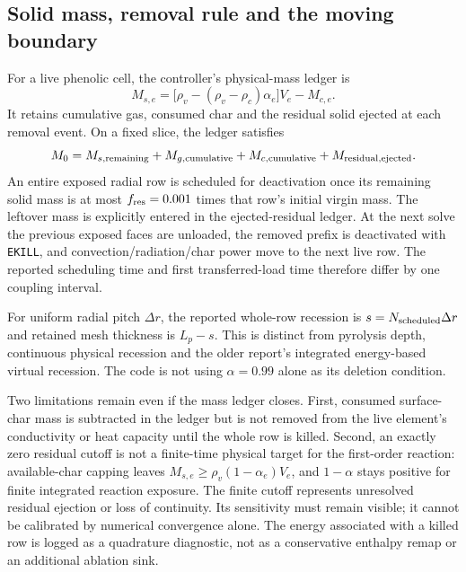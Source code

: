 \documentclass[oneside,openany]{amsdtx}
\begin{document}
\subsection{Solid mass, removal rule and the moving boundary}
For a live phenolic cell, the controller's physical-mass ledger is
\begin{equation}
 M_{s,e}=\bigl[\rho_v-(\rho_v-\rho_c)\alpha_e\bigr]V_e-M_{c,e}.
\end{equation}
It retains cumulative gas, consumed char and the residual solid ejected at each removal event. On a fixed slice, the ledger satisfies
\begin{equation}
 M_0=M_{s,\rm remaining}+M_{g,\rm cumulative}+M_{c,\rm cumulative}+M_{\rm residual,ejected}.
\end{equation}
An entire exposed radial row is scheduled for deactivation once its remaining solid mass is at most $f_{\rm res}=0.001$ times that row's initial virgin mass. The leftover mass is explicitly entered in the ejected-residual ledger. At the next solve the previous exposed faces are unloaded, the removed prefix is deactivated with \texttt{EKILL}, and convection/radiation/char power move to the next live row. The reported scheduling time and first transferred-load time therefore differ by one coupling interval.

For uniform radial pitch $\Delta r$, the reported whole-row recession is $s=N_{\rm scheduled}\Delta r$ and retained mesh thickness is $L_p-s$. This is distinct from pyrolysis depth, continuous physical recession and the older report's integrated energy-based virtual recession. The code is not using $\alpha=0.99$ alone as its deletion condition.

Two limitations remain even if the mass ledger closes. First, consumed surface-char mass is subtracted in the ledger but is not removed from the live element's conductivity or heat capacity until the whole row is killed. Second, an exactly zero residual cutoff is not a finite-time physical target for the first-order reaction: available-char capping leaves $M_{s,e}\geq\rho_v(1-\alpha_e)V_e$, and $1-\alpha$ stays positive for finite integrated reaction exposure. The finite cutoff represents unresolved residual ejection or loss of continuity. Its sensitivity must remain visible; it cannot be calibrated by numerical convergence alone. The energy associated with a killed row is logged as a quadrature diagnostic, not as a conservative enthalpy remap or an additional ablation sink.
\end{document}
